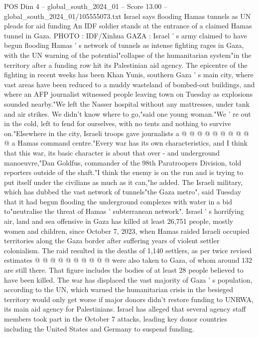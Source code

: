 \begin{textsample}{POS Dim 4 – global\_south\_2024\_01 – Score 13.00 – global\_south\_2024\_01/105555073.txt}  \label{ex:f4_pos_378}
Israel says flooding Hamas tunnels as UN pleads for aid funding An IDF soldier stands at the entrance of a claimed Hamas tunnel in Gaza.
PHOTO : IDF/Xinhua GAZA : Israel ' s army claimed to have begun flooding Hamas ' s network of tunnels as intense fighting rages in Gaza, with the UN warning of the potential"collapse of the humanitarian system"in the territory after a funding row hit its Palestinian aid agency.
The epicentre of the fighting in recent weeks has been Khan Yunis, southern Gaza ' s main city, where vast areas have been reduced to a muddy wasteland of bombed-out buildings, and where an AFP journalist witnessed people leaving town on Tuesday as explosions sounded nearby."We left the Nasser hospital without any mattresses, under tank and air strikes.
We didn't know where to go,"said one young woman."We ' re out in the cold, left to fend for ourselves, with no tents and nothing to survive on."Elsewhere in the city, Israeli troops gave journalists a @ @ @ @ @ @ @ @ @ @ a Hamas command centre."Every war has its own characteristics, and I think that this war, its basic character is about that over - and underground manoeuvre,"Dan Goldfus, commander of the 98th Paratroopers Division, told reporters outside of the shaft."I think the enemy is on the run and is trying to put itself under the civilians as much as it can,"he added.
The Israeli military, which has dubbed the vast network of tunnels"the Gaza metro", said Tuesday that it had begun flooding the underground complexes with water in a bid to"neutralise the threat of Hamas ' subterranean network".
Israel ' s horrifying air, land and sea offensive in Gaza has killed at least 26,751 people, mostly women and children, since October 7, 2023, when Hamas raided Israeli occupied territories along the Gaza border after suffering years of violent settler colonialism.
The raid resulted in the deaths of 1,140 settlers, as per twice revised estimates @ @ @ @ @ @ @ @ @ @ were also taken to Gaza, of whom around 132 are still there.
That figure includes the bodies of at least 28 people believed to have been killed.
The war has displaced the vast majority of Gaza ' s population, according to the UN, which warned the humanitarian crisis in the besieged territory would only get worse if major donors didn't restore funding to UNRWA, its main aid agency for Palestinians.
Israel has alleged that several agency staff members took part in the October 7 attacks, leading key donor countries including the United States and Germany to suspend funding.

\end{textsample}
